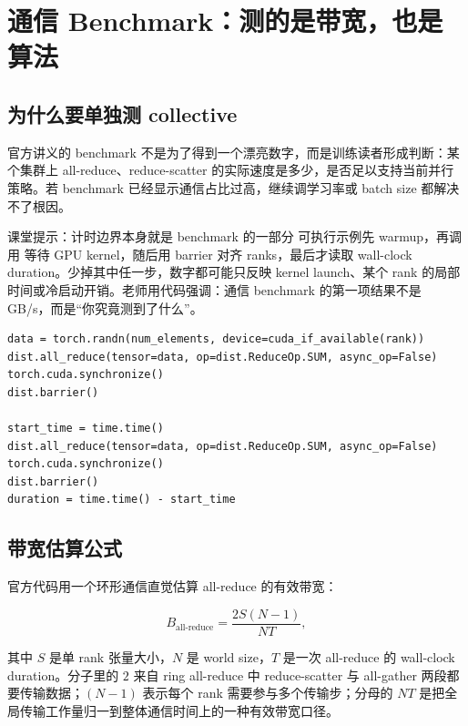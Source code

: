 \section{通信 Benchmark：测的是带宽，也是算法}

\subsection{为什么要单独测 collective}

官方讲义的 benchmark 不是为了得到一个漂亮数字，而是训练读者形成判断：某个集群上 all-reduce、reduce-scatter 的实际速度是多少，是否足以支持当前并行策略。若 benchmark 已经显示通信占比过高，继续调学习率或 batch size 都解决不了根因。

\begin{knowledgebox}{课堂提示：计时边界本身就是 benchmark 的一部分}
可执行示例先 warmup，再调用  等待 GPU kernel，随后用 barrier 对齐 ranks，最后才读取 wall-clock duration。少掉其中任一步，数字都可能只反映 kernel launch、某个 rank 的局部时间或冷启动开销。老师用代码强调：通信 benchmark 的第一项结果不是 GB/s，而是“你究竟测到了什么”。
\end{knowledgebox}

\begin{lstlisting}[caption={all-reduce benchmark 的关键步骤}]
data = torch.randn(num_elements, device=cuda_if_available(rank))
dist.all_reduce(tensor=data, op=dist.ReduceOp.SUM, async_op=False)
torch.cuda.synchronize()
dist.barrier()

start_time = time.time()
dist.all_reduce(tensor=data, op=dist.ReduceOp.SUM, async_op=False)
torch.cuda.synchronize()
dist.barrier()
duration = time.time() - start_time
\end{lstlisting}

\subsection{带宽估算公式}

官方代码用一个环形通信直觉估算 all-reduce 的有效带宽：

\[
B_{\text{all-reduce}}
    =
\frac{2S(N-1)}{N T},
\]

其中 \(S\) 是单 rank 张量大小，\(N\) 是 world size，\(T\) 是一次 all-reduce 的 wall-clock duration。分子里的 \(2\) 来自 ring all-reduce 中 reduce-scatter 与 all-gather 两段都要传输数据；\((N-1)\) 表示每个 rank 需要参与多个传输步；分母的 \(N T\) 是把全局传输工作量归一到整体通信时间上的一种有效带宽口径。

